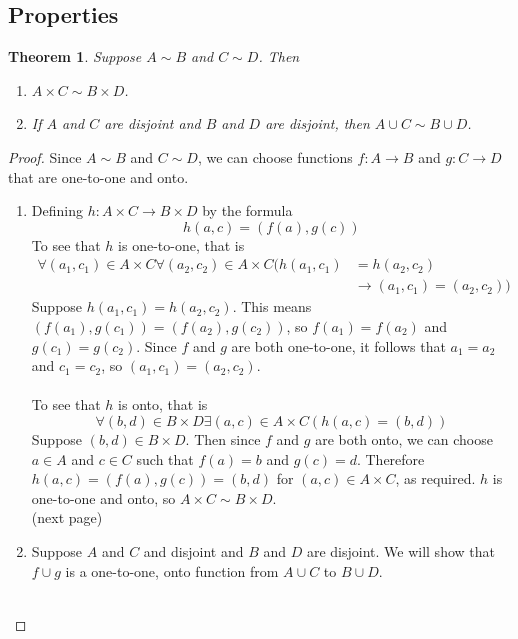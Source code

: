 \documentclass{report}
\newtheorem*{theorem}{Theorem}
\theoremstyle{definition}
\begin{document}
\subsection{Properties}
\begin{theorem}
Suppose $A\sim B$ and $C\sim D$. Then
\begin{enumerate}
\item$A\times C\sim B\times D$.
\item If $A$ and $C$ are disjoint and $B$ and $D$ are disjoint, then $A\cup C\sim B\cup D$.
\end{enumerate}
\end{theorem}
\begin{proof}
Since $A\sim B$ and $C\sim D$, we can choose functions $f:A\to B$ and $g:C\to D$ that are one-to-one and onto.
\begin{enumerate}
\item Defining $h:A\times C\to B\times D$ by the formula
\begin{equation*}
h(a,c)=(f(a),g(c))
\end{equation*}
To see that $h$ is one-to-one, that is
\begin{align*}
\forall(a_1,c_1)\in A\times C\forall(a_2,c_2)\in A\times C(
h(a_1,c_1)&=h(a_2,c_2)\\&\to(a_1,c_1)=(a_2,c_2))
\end{align*}
Suppose $h(a_1,c_1)=h(a_2,c_2)$. This means $(f(a_1),g(c_1))=(f(a_2),g(c_2))$, so $f(a_1)=f(a_2)$ and $g(c_1)=g(c_2)$. Since $f$ and $g$
are both one-to-one, it follows that $a_1=a_2$ and $c_1=c_2$, so
$(a_1,c_1)=(a_2,c_2)$.\\
\vspace{1mm}\\
To see that $h$ is onto, that is
\begin{equation*}
\forall(b,d)\in B\times D\exists(a,c)\in A\times C(h(a,c)=(b,d))
\end{equation*}
Suppose $(b,d)\in B\times D$. Then since $f$ and $g$ are both onto, we can choose $a\in A$ and $c\in C$ such that $f(a)=b$ and $g(c)=d$.
Therefore $h(a,c)=(f(a),g(c))=(b,d)$ for $(a,c)\in A\times C$, as required. $h$ is one-to-one and onto, so $A\times C\sim B\times D$.\\
(next page)\newpage
\item Suppose $A$ and $C$ and disjoint and $B$ and $D$ are disjoint.
We will show that $f\cup g$ is a one-to-one, onto function from $A\cup C$ to $B\cup D$.\\
\vspace{1mm}\\

\end{enumerate}
\end{proof}
\end{document}
